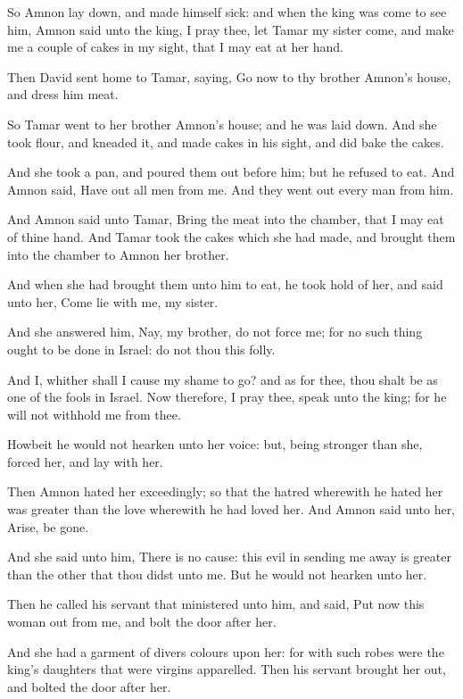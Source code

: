 \verse So Amnon lay down, and made himself sick: and when the king was come to see him, Amnon said unto the king, I pray thee, let Tamar my sister come, and make me a couple of cakes in my sight, that I may eat at her hand.

\verse Then David sent home to Tamar, saying, Go now to thy brother Amnon's house, and dress him meat.

\verse So Tamar went to her brother Amnon's house; and he was laid down.  And she took flour, and kneaded it, and made cakes in his sight, and did bake the cakes.

\verse And she took a pan, and poured them out before him; but he refused to eat. And Amnon said, Have out all men from me. And they went out every man from him.

\verse And Amnon said unto Tamar, Bring the meat into the chamber, that I may eat of thine hand. And Tamar took the cakes which she had made, and brought them into the chamber to Amnon her brother.

\verse And when she had brought them unto him to eat, he took hold of her, and said unto her, Come lie with me, my sister.

\verse And she answered him, Nay, my brother, do not force me; for no such thing ought to be done in Israel: do not thou this folly.

\verse And I, whither shall I cause my shame to go? and as for thee, thou shalt be as one of the fools in Israel. Now therefore, I pray thee, speak unto the king; for he will not withhold me from thee.

\verse Howbeit he would not hearken unto her voice: but, being stronger than she, forced her, and lay with her.

\verse Then Amnon hated her exceedingly; so that the hatred wherewith he hated her was greater than the love wherewith he had loved her. And Amnon said unto her, Arise, be gone.

\verse And she said unto him, There is no cause: this evil in sending me away is greater than the other that thou didst unto me. But he would not hearken unto her.

\verse Then he called his servant that ministered unto him, and said, Put now this woman out from me, and bolt the door after her.

\verse And she had a garment of divers colours upon her: for with such robes were the king's daughters that were virgins apparelled. Then his servant brought her out, and bolted the door after her.

